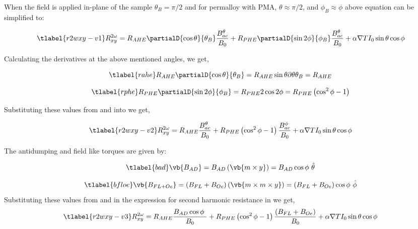 When the field is applied in-plane of the sample $\theta_{B}=\pi/2$ and for permalloy with PMA, 
$\theta \approx \pi/2$, and $\phi_{B} \approx \phi$  above equation can be simplified to:


\begin{equation}
    \tlabel{r2wxy-v1}
    R^{2 \omega}_{xy}  = R_{AHE} \partialD{\cos{\theta}}
    {\theta_B} \frac{B^{\theta}_{ac}}{B_{0}} + R_{PHE} 
    \partialD{\sin{2\phi}}{\phi_B} \frac{B^{\theta}_{ac}}{B_{0}}  + 
    \alpha \nabla {T} I_{0} \sin{\theta} \cos{\phi}
\end{equation}

Calculating the derivatives at the above mentioned angles, we get,

\begin{equation}
    \tlabel{rahe}
    R_{AHE} \partialD{\cos{\theta}} {\theta_B} = R_{AHE} \sin{\theta} \partial{\theta}{\theta_{B}} = R_{AHE} \\
    \end{equation}

\begin{equation}
    \tlabel{rphe}
    R_{PHE} \partialD{\sin{2\phi}}{\phi_B} = R_{PHE} 2 \cos{2 \phi} =
    R_{PHE} \left( \cos^{2}{\phi} - 1 \right) 
\end{equation}

Substituting these values from  and  into  
we get,

\begin{equation}
    \tlabel{r2wxy-v2}
    R^{2 \omega}_{xy}  = R_{AHE} \frac{B^{\theta}_{ac}}{B_{0}} 
    + R_{PHE} \left( \cos^{2}{\phi} - 1 \right) \frac{B^{\phi}_{ac}}{B_{0}}
    + \alpha \nabla {T} I_{0} \sin{\theta} \cos{\phi}
\end{equation}

The antidumping and field like torques are given by:

\begin{equation}
    \tlabel{bad}
    \vb{B_{AD}} = B_{AD} \left( \vb{m \times y} \right)
    = B_{AD} \cos{\phi}\ \hat{\theta}
\end{equation}

\begin{equation}
    \tlabel{bfloe}
    \vb{B_{FL+Oe}} = \left( B_{FL} + B_{Oe} \right) \left( \vb{m \times m \times y} \right)
    = \left( B_{FL} + B_{Oe} \right) \cos {\phi}\ \hat{\phi}
\end{equation}
Substituting these values from  and  in the expression 
for second harmonic resistance in  we get,
\begin{equation}
    \tlabel{r2wxy-v3}
    R^{2 \omega}_{xy}  = R_{AHE} \frac{B_{AD} \cos{\phi}\ }{B_{0}} 
    + R_{PHE} \left( \cos^{2}{\phi} - 1 \right) \frac{ \left( B_{FL} + B_{Oe} \right) }{B_{0}}
    + \alpha \nabla {T} I_{0} \sin{\theta} \cos{\phi}
\end{equation}

